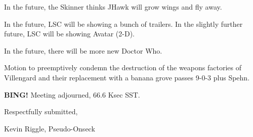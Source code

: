 \documentclass[10pt]{article}
\newcommand{\bing}{{\bf BING!} }
\newcommand{\ps}{ plus Spehn\xspace}
\newcommand{\onseck}{Kevin Riggle, Pseudo-Onseck}
\begin{document}
In the future, the Skinner thinks JHawk will grow wings and fly away.

In the future, LSC will be showing a bunch of trailers.  In the slightly further future, LSC will be showing Avatar (2-D).

In the future, there will be more new Doctor Who.

Motion to preemptively condemn the destruction of the weapons factories of Villengard and their replacement with a banana grove passes 9-0-3\ps.

\bing
\noindent
Meeting adjourned, 66.6 Ksec SST.

\vspace{18pt}

\centerline{Respectfully submitted,}
\centerline{\onseck}
\end{document}

